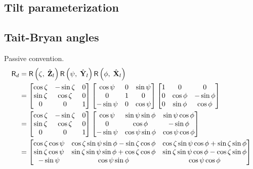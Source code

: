 \documentclass[12pt,letterpaper,final]{amsart}
\newcommand{\mbm}[1]{\ensuremath{\mbox{\boldmath$#1$}}}
\newcommand{\rmatd}{\ensuremath{\mathsf{R}_d}}
\newcommand{\Xl}{\ensuremath{\hat{\mbm{\mathrm{X}}}_l}}
\newcommand{\Yl}{\ensuremath{\hat{\mbm{\mathrm{Y}}}_l}}
\newcommand{\Zl}{\ensuremath{\hat{\mbm{\mathrm{Z}}}_l}}
\newcommand{\rmat}[2]{\ensuremath{\mathsf{R}\left(#1,\;#2\right)}}
\begin{document}
\begin{appendix}
\section{Tilt parameterization}
\subsection{Tait-Bryan angles}
Passive convention.
\begin{align}
\rmatd &= \rmat{\zeta}{\Zl}\rmat{\psi}{\Yl}\rmat{\phi}{\Xl} \label{E:rmatd} \\
	&= 	\begin{bmatrix} 
			\cos{\zeta} & -\sin{\zeta} &  0  \\
			\sin{\zeta} &  \cos{\zeta} &  0  \\
			 0  &  0  &  1 
		\end{bmatrix}
		\begin{bmatrix} 
			\cos{\psi} &  0  & \sin{\psi} \\
			 0  &  1  &  0  \\
			-\sin{\psi} &  0  & \cos{\psi}
		\end{bmatrix}
		\begin{bmatrix} 
			 1  &  0  &  0  \\
			 0  & \cos{\phi} & -\sin{\phi} \\
			 0  & \sin{\phi} & \cos{\phi}
		\end{bmatrix} \nonumber\\
	&= 	\begin{bmatrix} 
			\cos{\zeta} & -\sin{\zeta} &  0  \\
			\sin{\zeta} &  \cos{\zeta} &  0  \\
			 0  &  0  &  1 
		\end{bmatrix}
		\begin{bmatrix} 
			\cos{\psi} &  \sin{\psi}\sin{\phi}  & \sin{\psi}\cos{\phi} \\
			 0  &  \cos{\phi}  &  -\sin{\phi}  \\
			-\sin{\psi} &  \cos{\psi}\sin{\phi}  & \cos{\psi}\cos{\phi}
		\end{bmatrix} \nonumber\\
	&= \begin{bmatrix} 
			\cos{\zeta}\cos{\psi} & \cos{\zeta}\sin{\psi}\sin{\phi} - \sin{\zeta}\cos{\phi} & \cos{\zeta}\sin{\psi}\cos{\phi} + \sin{\zeta}\sin{\phi} \\
			\sin{\zeta}\cos{\psi} & \sin{\zeta}\sin{\psi}\sin{\phi} + \cos{\zeta}\cos{\phi} & \sin{\zeta}\sin{\psi}\cos{\phi} - \cos{\zeta}\sin{\phi} \\
			-\sin{\psi} & \cos{\psi}\sin{\phi} & \cos{\psi}\cos{\phi}
		\end{bmatrix} \nonumber
\end{align}
\end{appendix} 


\end{document}
